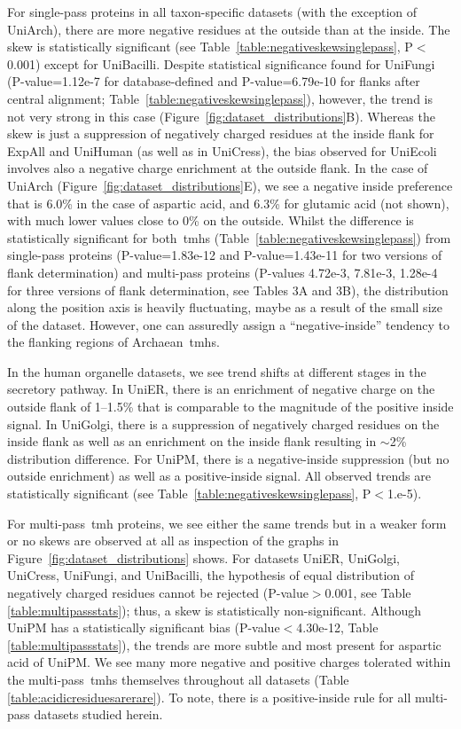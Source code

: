 For single-pass proteins in all taxon-specific datasets (with the exception of UniArch), there are more negative residues at the outside than at the inside.
The skew is statistically significant (see Table~\ref{table:negativeskewsinglepass}, P$<$0.001) except for UniBacilli.
Despite statistical significance found for UniFungi (P\--value=1.12e-7 for database-defined and P\--value=6.79e-10 for flanks after central alignment; Table~\ref{table:negativeskewsinglepass}), however, the trend is not very strong in this case (Figure~\ref{fig:dataset_distributions}B).
Whereas the skew is just a suppression of negatively charged residues at the inside flank for ExpAll and UniHuman (as well as in UniCress), the bias observed for UniEcoli involves also a negative charge enrichment at the outside flank.
In the case of UniArch (Figure~\ref{fig:dataset_distributions}E), we see a negative inside preference that is 6.0\% in the case of aspartic acid, and 6.3\% for glutamic acid (not shown), with much lower values close to 0\% on the outside.
Whilst the difference is statistically significant for both~\gls{tmh}s (Table~\ref{table:negativeskewsinglepass}) from single-pass proteins (P\--value=1.83e-12 and P\--value=1.43e-11 for two versions of flank determination) and multi-pass proteins (P\--values 4.72e-3, 7.81e-3, 1.28e-4 for three versions of flank determination, see Tables 3A and 3B), the distribution along the position axis is heavily fluctuating, maybe as a result of the small size of the dataset.
However, one can assuredly assign a ``negative-inside'' tendency to the flanking regions of Archaean~\gls{tmh}s.

In the human organelle datasets, we see trend shifts at different stages in the secretory pathway.
In UniER, there is an enrichment of negative charge on the outside flank of 1--1.5\% that is comparable to the magnitude of the positive inside signal.
In UniGolgi, there is a suppression of negatively charged residues on the inside flank as well as an enrichment on the inside flank resulting in \(\sim\)2\% distribution difference.
For UniPM, there is a negative-inside suppression (but no outside enrichment) as well as a positive-inside signal.
All observed trends are statistically significant (see Table~\ref{table:negativeskewsinglepass}, P$<$1.e-5).

For multi-pass~\gls{tmh} proteins, we see either the same trends but in a weaker form or no skews are observed at all as inspection of the graphs in Figure~\ref{fig:dataset_distributions} shows.
For datasets UniER, UniGolgi, UniCress, UniFungi, and UniBacilli, the hypothesis of equal distribution of negatively charged residues cannot be rejected (P\--value$>$0.001, see Table \ref{table:multipassstats}); thus, a skew is statistically non-significant.
Although UniPM has a statistically significant bias (P\--value$<$4.30e-12, Table \ref{table:multipassstats}), the trends are more subtle and most present for aspartic acid of UniPM\@.
We see many more negative and positive charges tolerated within the multi-pass~\gls{tmh}s themselves throughout all datasets (Table \ref{table:acidicresiduesarerare}).
To note, there is a positive-inside rule for all multi-pass datasets studied herein.

